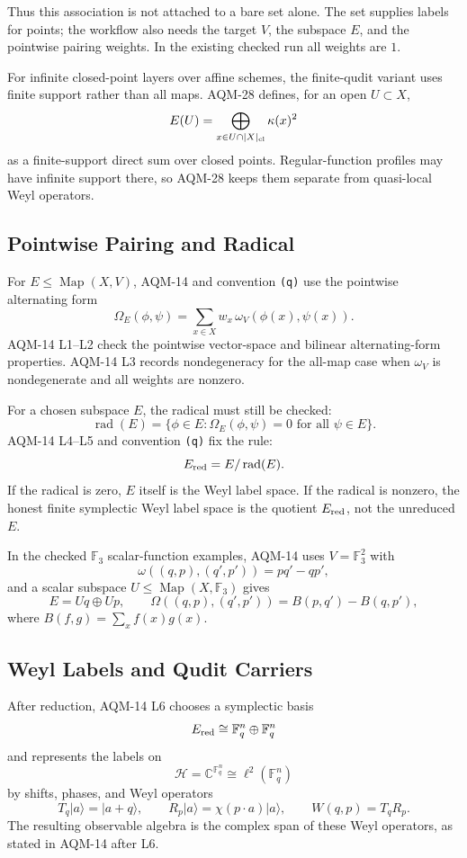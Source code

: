 Thus this association is not attached to a bare set alone.  The set supplies
labels for points; the workflow also needs the target \(V\), the subspace
\(E\), and the pointwise pairing weights.  In the existing checked run all
weights are \(1\).

For infinite closed-point layers over affine schemes, the finite-qudit variant
uses finite support rather than all maps.  AQM-28 defines, for an open
\(U\subset X\),
\[
  E(U)=\bigoplus_{x\in U\cap |X|_{\rm cl}}\kappa(x)^2
\]
as a finite-support direct sum over closed points.  Regular-function profiles
may have infinite support there, so AQM-28 keeps them separate from
quasi-local Weyl operators.

\subsection{Pointwise Pairing and Radical}

For \(E\leq\operatorname{Map}(X,V)\), AQM-14 and convention \texttt{(q)} use
the pointwise alternating form
\[
  \Omega_E(\phi,\psi)
  =
  \sum_{x\in X} w_x\,\omega_V(\phi(x),\psi(x)).
\]
AQM-14 L1--L2 check the pointwise vector-space and bilinear alternating-form
properties.  AQM-14 L3 records nondegeneracy for the all-map case when
\(\omega_V\) is nondegenerate and all weights are nonzero.

For a chosen subspace \(E\), the radical must still be checked:
\[
  \operatorname{rad}(E)
  =
  \{\phi\in E:\Omega_E(\phi,\psi)=0\text{ for all }\psi\in E\}.
\]
AQM-14 L4--L5 and convention \texttt{(q)} fix the rule:
\[
  E_{\rm red}=E/\operatorname{rad}(E).
\]
If the radical is zero, \(E\) itself is the Weyl label space.  If the radical
is nonzero, the honest finite symplectic Weyl label space is the quotient
\(E_{\rm red}\), not the unreduced \(E\).

In the checked \(\mathbb F_3\) scalar-function examples, AQM-14 uses
\(V=\mathbb F_3^2\) with
\[
  \omega((q,p),(q',p'))=p q'-q p',
\]
and a scalar subspace \(U\leq\operatorname{Map}(X,\mathbb F_3)\) gives
\[
  E=Uq\oplus Up,\qquad
  \Omega((q,p),(q',p'))=B(p,q')-B(q,p'),
\]
where \(B(f,g)=\sum_x f(x)g(x)\).

\subsection{Weyl Labels and Qudit Carriers}

After reduction, AQM-14 L6 chooses a symplectic basis
\[
  E_{\rm red}\cong \mathbb F_q^n\oplus\mathbb F_q^n
\]
and represents the labels on
\[
  \mathcal H=\mathbb C^{\mathbb F_q^n}\cong \ell^2(\mathbb F_q^n)
\]
by shifts, phases, and Weyl operators
\[
  T_q|a\rangle=|a+q\rangle,\qquad
  R_p|a\rangle=\chi(p\cdot a)|a\rangle,\qquad
  W(q,p)=T_qR_p.
\]
The resulting observable algebra is the complex span of these Weyl operators,
as stated in AQM-14 after L6.

